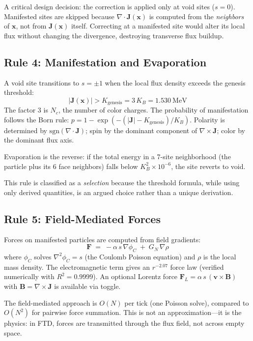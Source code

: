 \documentclass[11pt,a4paper]{article}
\newcommand{\Nc}{N_c}
\newcommand{\KB}{K_B}
\newcommand{\etag}[1]{{\normalfont\textsc{\footnotesize [#1]}}}
\theoremstyle{compact}
\begin{document}
A critical design decision: the correction is applied only at void sites ($s = 0$). Manifested sites are skipped because $\nabla \cdot \mathbf{J}(\mathbf{x})$ is computed from the \emph{neighbors} of $\mathbf{x}$, not from $\mathbf{J}(\mathbf{x})$ itself. Correcting at a manifested site would alter its local flux without changing the divergence, destroying transverse flux buildup.

\subsection*{Rule 4: Manifestation and Evaporation \quad\normalfont\etag{Selection}}

A void site transitions to $s = \pm 1$ when the local flux density exceeds the genesis threshold:
\[
|\mathbf{J}(\mathbf{x})| > K_{\mathrm{genesis}} = 3\,\KB = 1.530~\mathrm{MeV}
\]
The factor 3 is $\Nc$, the number of color charges. The probability of manifestation follows the Born rule: $p = 1 - \exp(-(|\mathbf{J}| - K_{\mathrm{genesis}})/\KB)$. Polarity is determined by $\mathrm{sgn}(\nabla \cdot \mathbf{J})$; spin by the dominant component of $\nabla \times \mathbf{J}$; color by the dominant flux axis.

Evaporation is the reverse: if the total energy in a 7-site neighborhood (the particle plus its 6 face neighbors) falls below $\KB^2 \times 10^{-6}$, the site reverts to void.

This rule is classified as a \emph{selection} because the threshold formula, while using only derived quantities, is an argued choice rather than a unique derivation.

\subsection*{Rule 5: Field-Mediated Forces \quad\normalfont\etag{Theorem}}

Forces on manifested particles are computed from field gradients:
\[
\mathbf{F} \;=\; -\alpha\,s\,\nabla\phi_C \;+\; G_N\,\nabla\rho
\]
where $\phi_C$ solves $\nabla^2 \phi_C = s$ (the Coulomb Poisson equation) and $\rho$ is the local mass density. The electromagnetic term gives an $r^{-2.07}$ force law (verified numerically with $R^2 = 0.9999$). An optional Lorentz force $\mathbf{F}_L = \alpha\,s\,(\mathbf{v} \times \mathbf{B})$ with $\mathbf{B} = \nabla \times \mathbf{J}$ is available via toggle.

The field-mediated approach is $O(N)$ per tick (one Poisson solve), compared to $O(N^2)$ for pairwise force summation. This is not an approximation---it is the physics: in FTD, forces are transmitted through the flux field, not across empty space.
\end{document}
